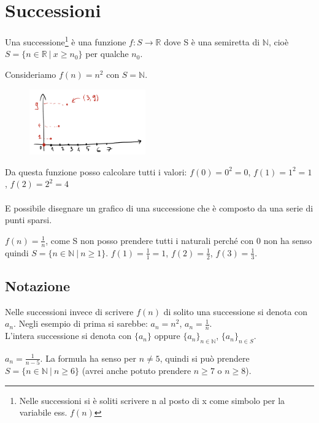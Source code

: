 \newpage
\section{Successioni}
\begin{definition}[Successione]
Una successione\footnote{Nelle successioni si è soliti scrivere n al posto di x come simbolo per la variabile ess. $f(n)$} è una funzione $f: S\to \mathbb{R}$ dove S è una semiretta di $\mathbb{N}$, cioè $S = \{n \in \mathbb{R}\:|\: x\geq n_0\}$ per qualche $n_0$.
\end{definition}

\begin{example}
Consideriamo $f(n) = n^2$ con $S = \mathbb{N}$.
\end{example}
\begin{figure}
    \vspace{-20pt}
    \centering
    \includegraphics[width=5cm]{images/esempio-successione-1.png}
\end{figure}
Da questa funzione posso calcolare tutti i valori: $f(0) = 0^2 = 0$, $f(1) = 1^2 = 1$, $f(2) = 2^2 = 4$\\\\
E possibile disegnare un grafico di una successione che è composto da una serie di punti sparsi.\\

\begin{example}
$f(n) = \frac{1}{n}$, come S non posso prendere tutti i naturali perché con 0 non ha senso quindi $S = \{n \in \mathbb{N} \: |\: n \geq 1\}$.  $f(1) = \frac{1}{1}=1$, $f(2) = \frac{1}{2}$, $f(3) = \frac{1}{3}$.
\end{example}

\subsection{Notazione}
Nelle successioni invece di scrivere $f(n)$ di solito una successione si denota con $a_n$. Negli esempio di prima si sarebbe: $a_n = n^2$, $a_n = \frac{1}{n}$.\\
L'intera successione si denota con $\{a_n\}$ oppure $\{a_n\}_{n\in \mathbb{N}}$, $\{a_n\}_{n\in S}$.
\begin{example}
$a_n = \frac{1}{n-5}$. La formula ha senso per $n\neq 5$, quindi si può prendere $S = \{n \in \mathbb{N} \:|\: n\geq 6\}$ (avrei anche potuto prendere $n \geq 7$ o $n \geq 8$).
\end{example}

